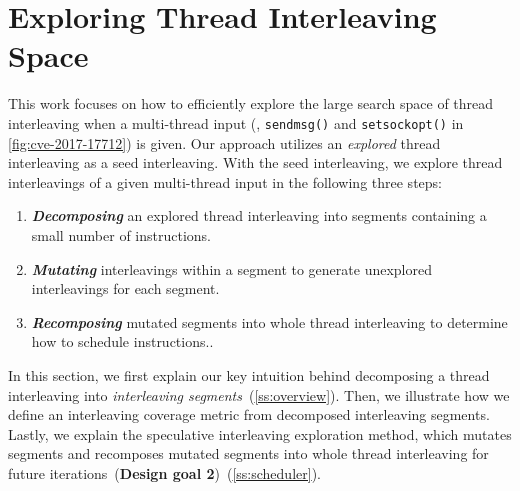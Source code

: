 \section{Exploring Thread Interleaving Space}
\label{s:design}

\newcommand{\intcov}{interleaving segment coverage\xspace}
\newcommand{\Intcov}{Interleaving segment coverage\xspace}




%

This work focuses on how to efficiently explore the large search space
of thread interleaving when a multi-thread input (\eg,
\texttt{sendmsg()} and \texttt{setsockopt()} in
\autoref{fig:cve-2017-17712}) is given. Our approach utilizes an
\textit{explored} thread interleaving as a seed interleaving.
%
With the seed interleaving, we explore thread interleavings of 
a given multi-thread input in the following three steps:
%
\begin{enumerate}[labelsep=0pt, label=\textbf{\arabic*) }]
\item \textbf{\textit{Decomposing}} an explored thread interleaving
  into segments containing a small number of instructions.
\item \textbf{\textit{Mutating}} interleavings within a segment to
  generate unexplored interleavings for each segment.
\item \textbf{\textit{Recomposing}} mutated segments into whole thread
  interleaving to determine how to schedule instructions..
\end{enumerate}
%



In this section, we first explain our key intuition behind
decomposing a thread interleaving into \textit{interleaving
  segments}~(\autoref{ss:overview}).
%
Then, we illustrate how we define an interleaving coverage metric 
from decomposed interleaving segments.
%
%
Lastly, we explain the speculative interleaving exploration method,
which mutates segments and recomposes mutated segments into whole
thread interleaving for future iterations~(\textbf{Design goal
  2})~(\autoref{ss:scheduler}). 



